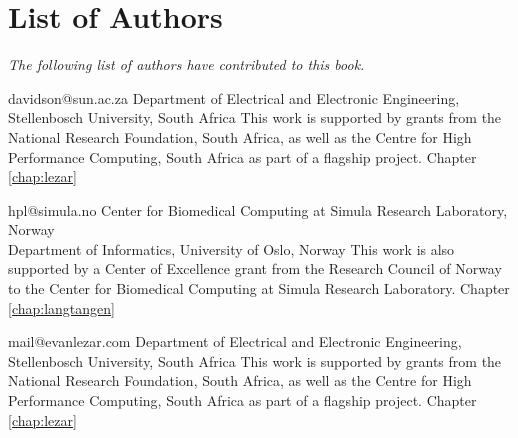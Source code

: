 \chapter*{List of Authors}

\emph{The following list of authors have contributed to this book.}

\vspace{1cm}



             {davidson@sun.ac.za}
             {Department of Electrical and Electronic Engineering, Stellenbosch University, South Africa}
             {This work is supported by grants from the National Research
              Foundation, South Africa, as well as the Centre for High Performance
              Computing, South Africa as part of a flagship project.}
             {Chapter \ref{chap:lezar}}










             {hpl@simula.no}
             {Center for Biomedical Computing at Simula Research Laboratory, Norway \\
              Department of Informatics, University of Oslo, Norway}
             {This work is also supported by a Center of Excellence
              grant from the Research Council of Norway to the Center
              for Biomedical Computing at Simula Research
              Laboratory.}
             {Chapter \ref{chap:langtangen}}

             {mail@evanlezar.com}
             {Department of Electrical and Electronic Engineering, Stellenbosch University, South Africa}
             {This work is supported by grants from the National Research
              Foundation, South Africa, as well as the Centre for High Performance
              Computing, South Africa as part of a flagship project.}
              {Chapter \ref{chap:lezar}}

